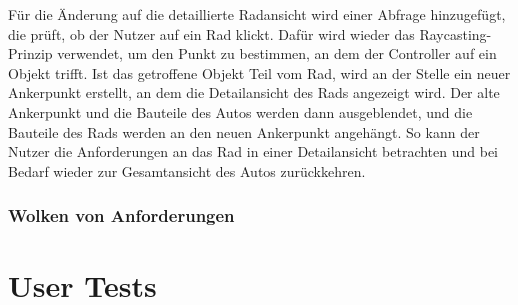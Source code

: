 Für die Änderung auf die detaillierte Radansicht wird einer Abfrage hinzugefügt, die prüft, ob der Nutzer auf ein Rad klickt.
Dafür wird wieder das Raycasting-Prinzip verwendet, um den Punkt zu bestimmen, an dem der Controller auf ein Objekt trifft.
Ist das getroffene Objekt Teil vom Rad, wird an der Stelle ein neuer Ankerpunkt erstellt, an dem die Detailansicht des Rads angezeigt wird.
Der alte Ankerpunkt und die Bauteile des Autos werden dann ausgeblendet, und die Bauteile des Rads werden an den neuen Ankerpunkt angehängt.
So kann der Nutzer die Anforderungen an das Rad in einer Detailansicht betrachten und bei Bedarf wieder zur Gesamtansicht des Autos zurückkehren.





\subsubsection{Wolken von Anforderungen}

\section{User Tests}